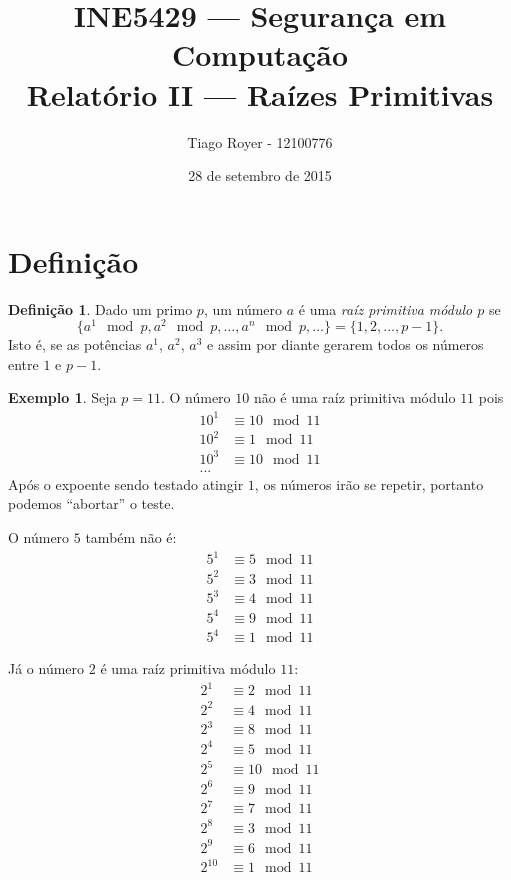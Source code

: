 \documentclass{article}
\title{
    INE5429 --- Segurança em Computação \\
    Relatório II --- Raízes Primitivas
}
\author{
    Tiago Royer - 12100776
}
\date{28 de setembro de 2015}
\theoremstyle{definition}
\newtheorem{definition}{Definição}
\newtheorem{example}{Exemplo}
\begin{document}
\maketitle

\section{Definição}

\begin{definition}
    Dado um primo $p$,
    um número $a$ é uma \emph{raíz primitiva módulo $p$}
    se
    \begin{equation*}
        \{a^1 \mod p, a^2 \mod p, \dots, a^n \mod p, \dots \} = \{1, 2, \dots, p-1\}.
    \end{equation*}
    Isto é, se as potências $a^1$, $a^2$, $a^3$ e assim por diante
    gerarem todos os números entre $1$ e $p-1$.
\end{definition}

\begin{example}
    Seja $p = 11$.
    O número $10$ não é uma raíz primitiva módulo $11$ pois
    \begin{align*}
        10^1 &\equiv 10 \mod 11 \\
        10^2 &\equiv 1 \mod 11 \\
        10^3 &\equiv 10 \mod 11 \\
        ...
    \end{align*}
    Após o expoente sendo testado atingir $1$,
    os números irão se repetir,
    portanto podemos ``abortar'' o teste.

    O número $5$ também não é:
    \begin{align*}
        5^1 &\equiv 5 \mod 11 \\
        5^2 &\equiv 3 \mod 11 \\
        5^3 &\equiv 4 \mod 11 \\
        5^4 &\equiv 9 \mod 11 \\
        5^4 &\equiv 1 \mod 11
    \end{align*}

    Já o número $2$ é uma raíz primitiva módulo $11$:
    \begin{align*}
        2^1 &\equiv 2 \mod 11 \\
        2^2 &\equiv 4 \mod 11 \\
        2^3 &\equiv 8 \mod 11 \\
        2^4 &\equiv 5 \mod 11 \\
        2^5 &\equiv 10 \mod 11 \\
        2^6 &\equiv 9 \mod 11 \\
        2^7 &\equiv 7 \mod 11 \\
        2^8 &\equiv 3 \mod 11 \\
        2^9 &\equiv 6 \mod 11 \\
        2^{10} &\equiv 1 \mod 11
    \end{align*}
\end{example}
\end{document}
